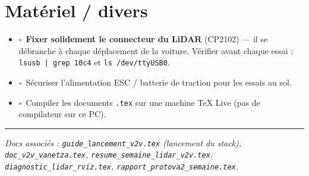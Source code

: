 \documentclass[a4paper,11pt]{article}
\newcommand{\todo}{$\square$\ }
\begin{document}
\section{Matériel / divers}
\begin{itemize}[leftmargin=1.6em, label={}]
  \item \todo \textbf{Fixer solidement le connecteur du LiDAR} (CP2102) --- il se
        débranche à chaque déplacement de la voiture. Vérifier avant chaque essai :
        \texttt{lsusb | grep 10c4} et \texttt{ls /dev/ttyUSB0}.
  \item \todo Sécuriser l'alimentation ESC / batterie de traction pour les essais au sol.
  \item \todo Compiler les documents \texttt{.tex} sur une machine TeX Live
        (pas de compilateur sur ce PC).
\end{itemize}

\vspace{6pt}\hrule
{\footnotesize\itshape Docs associés : \texttt{guide\_lancement\_v2v.tex} (lancement du stack),
\texttt{doc\_v2v\_vanetza.tex}, \texttt{resume\_semaine\_lidar\_v2v.tex},
\texttt{diagnostic\_lidar\_rviz.tex}, \texttt{rapport\_protova2\_semaine.tex}.}
\end{document}
